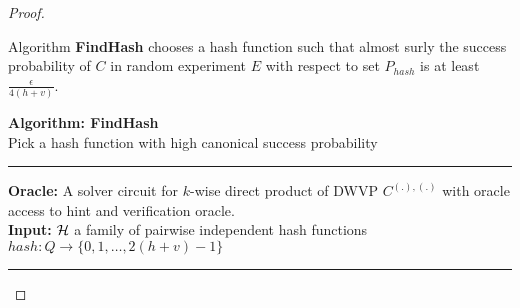 \begin{proof}
\begin{lemma}
Algorithm \textbf{FindHash} chooses a hash function such that almost surly the success probability of $C$ in random experiment $E$
with respect to set $P_{hash}$ is at least $\frac{\epsilon}{4(h+v)}$.
\end{lemma}
\begin{codeblock}
  \textbf{Algorithm: FindHash} \\
  Pick a hash function with high canonical success probability
  \medskip

  \hrule

  \medskip

  \textbf{Oracle:} A solver circuit for $k$-wise direct product of DWVP $C^{(.),(.)}$ with oracle access to hint and verification oracle.\\
  \textbf{Input:} $\mathcal{H}$ a family of pairwise independent hash functions $hash: Q \rightarrow \{0,1,\dots, 2(h+v)-1\}$  \\

  \medskip\hrule\medskip


\end{codeblock}
\end{proof}
